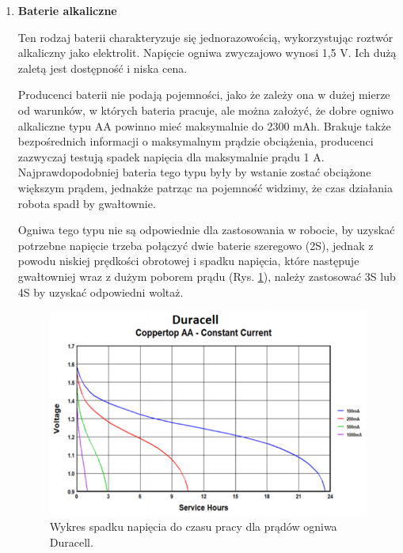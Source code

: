 \documentclass{report}
\begin{document}
\begin{enumerate}[label=(\Alph*)]
    \item \textbf{Baterie alkaliczne}

    Ten rodzaj baterii charakteryzuje się jednorazowością, wykorzystując roztwór alkaliczny jako elektrolit. Napięcie ogniwa zwyczajowo wynosi 1,5 V. Ich dużą zaletą jest dostępność i niska cena.
    
    Producenci baterii nie podają pojemności, jako że zależy ona w dużej mierze od warunków, w których bateria pracuje, ale można założyć, że dobre ogniwo alkaliczne typu AA powinno mieć maksymalnie do 2300 mAh. Brakuje także bezpośrednich informacji o maksymalnym prądzie obciążenia, producenci zazwyczaj testują spadek napięcia dla maksymalnie prądu 1 A. Najprawdopodobniej bateria tego typu były by wstanie zostać obciążone większym prądem, jednakże patrząc na pojemność widzimy, że czas działania robota spadł by gwałtownie.
    
    Ogniwa tego typu nie są odpowiednie dla zastosowania w robocie, by uzyskać potrzebne napięcie trzeba połączyć dwie baterie szeregowo (2S), jednak z powodu niskiej prędkości obrotowej i spadku napięcia, które następuje gwałtowniej wraz z dużym poborem prądu (Rys. \ref{fig:duracell}), należy zastosować 3S lub 4S by uzyskać odpowiedni woltaż.
    
    \begin{figure}[H]
        \centering
        \includegraphics{src/cells_charts/Duracell discharge.png}
        \caption{Wykres spadku napięcia do czasu pracy dla prądów ogniwa Duracell.}
        \label{fig:duracell}
    \end{figure}


\end{enumerate}
\end{document}
